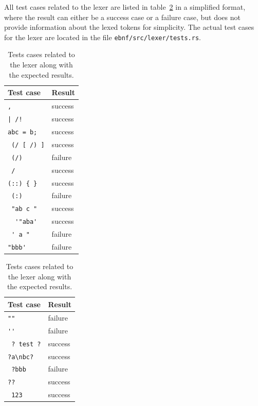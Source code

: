 \documentclass[english,engineering]{wizthesis}
\begin{document}
All test cases related to the lexer are listed in
table~\ref{tab:lexer-test-cases} in a simplified format, where the result can
either be a success case or a failure case, but does not provide information
about the lexed tokens for simplicity. The actual test cases for the lexer
are located in the file \texttt{ebnf/src/lexer/tests.rs}.

\begin{table}[H]
  \centering
  \caption{Tests cases related to the lexer along with the expected results.}
  \label{tab:lexer-test-cases}
  \begin{tabular}{@{}ll@{}}
    \toprule
    Test case & Result \\ \midrule
    \verb*@,@                    & success \\
    \verb*@| /!@                 & success \\
    \verb*@abc = b;@             & success \\
    \verb*@ (/ [ /) ]@           & success \\
    \verb*@ (/) @                & failure \\
    \verb*@ /@                   & success \\
    \verb*@(::) { } @            & success \\
    \verb*@ (:) @                & failure \\
    \verb*@ "ab c " @            & success \\
    \verb*@  '"aba' @            & success \\
    \verb*@ ' a "@               & failure \\
    \verb*@"bbb'   @             & failure \\ \bottomrule
  \end{tabular}
  \hspace{0.5cm}
  \begin{tabular}{@{}ll@{}}
    \toprule
    Test case & Result \\ \midrule
    \verb*@""@                   & failure \\
    \verb*@''@                   & failure \\
    \verb*@ ? test ?@            & success \\
    \verb*@?a\nbc?  @            & success \\
    \verb*@ ?bbb  @              & failure \\
    \verb*@??@                   & success \\
    \verb*@ 123 @                & success \\

\end{tabular}
\end{table}
\end{document}
